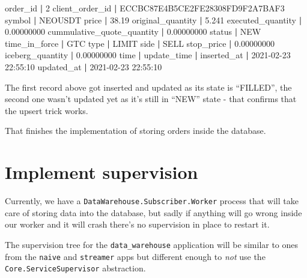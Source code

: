 \documentclass[
]{book}
\newenvironment{Shaded}{\begin{snugshade}}{\end{snugshade}}
\newcommand{\BuiltInTok}[1]{#1}
\newcommand{\ExtensionTok}[1]{#1}
\newcommand{\KeywordTok}[1]{\textcolor[rgb]{0.13,0.29,0.53}{\textbf{#1}}}
\newcommand{\NormalTok}[1]{#1}
\begin{document}
\begin{Shaded}
\begin{Highlighting}[]
\ExtensionTok{order\_id}                   \KeywordTok{|} \ExtensionTok{2}
\ExtensionTok{client\_order\_id}            \KeywordTok{|} \ExtensionTok{ECCBC87E4B5CE2FE28308FD9F2A7BAF3}
\ExtensionTok{symbol}                     \KeywordTok{|} \ExtensionTok{NEOUSDT}
\ExtensionTok{price}                      \KeywordTok{|} \ExtensionTok{38.19}
\ExtensionTok{original\_quantity}          \KeywordTok{|} \ExtensionTok{5.241}
\ExtensionTok{executed\_quantity}          \KeywordTok{|} \ExtensionTok{0.00000000}
\ExtensionTok{cummulative\_quote\_quantity} \KeywordTok{|} \ExtensionTok{0.00000000}
\ExtensionTok{status}                     \KeywordTok{|} \ExtensionTok{NEW}
\ExtensionTok{time\_in\_force}              \KeywordTok{|} \ExtensionTok{GTC}
\BuiltInTok{type}                       \KeywordTok{|} \ExtensionTok{LIMIT}
\ExtensionTok{side}                       \KeywordTok{|} \ExtensionTok{SELL}
\ExtensionTok{stop\_price}                 \KeywordTok{|} \ExtensionTok{0.00000000}
\ExtensionTok{iceberg\_quantity}           \KeywordTok{|} \ExtensionTok{0.00000000}
\BuiltInTok{time}                       \KeywordTok{|} 
\ExtensionTok{update\_time}                \KeywordTok{|} 
\ExtensionTok{inserted\_at}                \KeywordTok{|} \ExtensionTok{2021{-}02{-}23}\NormalTok{ 22:55:10}
\ExtensionTok{updated\_at}                 \KeywordTok{|} \ExtensionTok{2021{-}02{-}23}\NormalTok{ 22:55:10}
\end{Highlighting}
\end{Shaded}

The first record above got inserted and updated as its state is ``FILLED'', the second one wasn't updated yet as it's still in ``NEW'' state - that confirms that the upsert trick works.

That finishes the implementation of storing orders inside the database.

\hypertarget{implement-supervision}{%
\section{Implement supervision}\label{implement-supervision}}

Currently, we have a \texttt{DataWarehouse.Subscriber.Worker} process that will take care of storing data into the database, but sadly if anything will go wrong inside our worker and it will crash there's no supervision in place to restart it.

The supervision tree for the \texttt{data\_warehouse} application will be similar to ones from the \texttt{naive} and \texttt{streamer} apps but different enough to \emph{not} use the \texttt{Core.ServiceSupervisor} abstraction.
\end{document}
